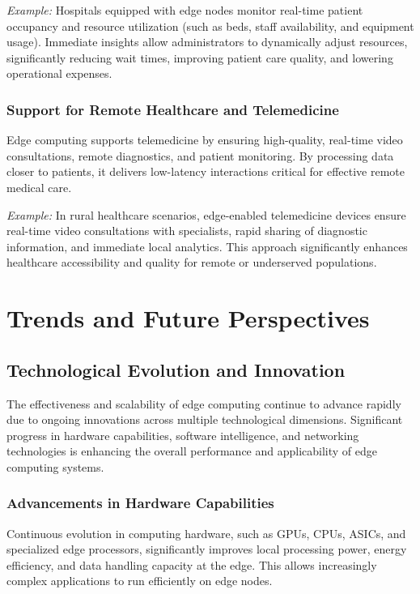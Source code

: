 \documentclass[runningheads]{llncs}
\begin{document}
\textit{Example:} Hospitals equipped with edge nodes monitor real-time patient occupancy and resource utilization (such as beds, staff availability, and equipment usage). Immediate insights allow administrators to dynamically adjust resources, significantly reducing wait times, improving patient care quality, and lowering operational expenses.

\subsubsection{Support for Remote Healthcare and Telemedicine}
Edge computing supports telemedicine by ensuring high-quality, real-time video consultations, remote diagnostics, and patient monitoring. By processing data closer to patients, it delivers low-latency interactions critical for effective remote medical care.

\textit{Example:} In rural healthcare scenarios, edge-enabled telemedicine devices ensure real-time video consultations with specialists, rapid sharing of diagnostic information, and immediate local analytics. This approach significantly enhances healthcare accessibility and quality for remote or underserved populations.


\section{Trends and Future Perspectives}

\subsection{Technological Evolution and Innovation}

The effectiveness and scalability of edge computing continue to advance rapidly due to ongoing innovations across multiple technological dimensions. Significant progress in hardware capabilities, software intelligence, and networking technologies is enhancing the overall performance and applicability of edge computing systems.

\subsubsection{Advancements in Hardware Capabilities}
Continuous evolution in computing hardware, such as GPUs, CPUs, ASICs, and specialized edge processors, significantly improves local processing power, energy efficiency, and data handling capacity at the edge. This allows increasingly complex applications to run efficiently on edge nodes.
\end{document}
